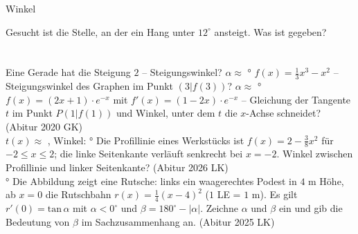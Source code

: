 \setcounter{aufgabe}{19}

\begin{aufgabe}{Winkel}
\begin{teile}
\teil Gesucht ist die Stelle, an der ein Hang unter $12^\circ$ ansteigt. Was ist gegeben? \\  \\  \\ 
\teil Eine Gerade hat die Steigung $2$ – Steigungswinkel? $\alpha \approx$ \leerfeld °
\teil $f(x) = \frac{1}{3}x^3 - x^2$ – Steigungswinkel des Graphen im Punkt $(3 | f(3))$? $\alpha \approx$ \leerfeld °
\teil $f(x) = (2x + 1) \cdot e^{-x}$ mit $f'(x) = (1 - 2x) \cdot e^{-x}$ – Gleichung der Tangente $t$ im Punkt $P(1 | f(1))$ und Winkel, unter dem $t$ die $x$-Achse schneidet? \hfill (Abitur 2020 GK) \\ $t(x) \approx$ \leerfeld , Winkel: \leerfeld °
\teil Die Profillinie eines Werkstücks ist $f(x) = 2 - \frac{3}{8}x^2$ für $-2 \le x \le 2$; die linke Seitenkante verläuft senkrecht bei $x = -2$. Winkel zwischen Profillinie und linker Seitenkante? \hfill (Abitur 2026 LK) \\ \leerfeld °
\teil Die Abbildung zeigt eine Rutsche: links ein waagerechtes Podest in $4$ m Höhe, ab $x = 0$ die Rutschbahn $r(x) = \frac{1}{4}(x - 4)^2$ ($1$ LE = $1$ m). Es gilt $r'(0) = \mathrm{tan}\,\alpha$ mit $\alpha < 0^\circ$ und $\beta = 180^\circ - |\alpha|$. Zeichne $\alpha$ und $\beta$ ein und gib die Bedeutung von $\beta$ im Sachzusammenhang an. \hfill (Abitur 2025 LK)


\end{teile}
\end{aufgabe}
